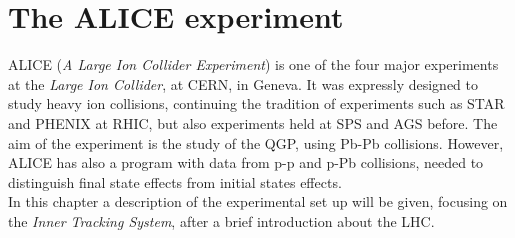\chapter{The ALICE experiment}
ALICE (\textit{A Large Ion Collider Experiment}) is one of the four major experiments at the \textit{Large Ion Collider}, at CERN, in Geneva. It was expressly designed to study heavy ion collisions, continuing the tradition of experiments such as STAR and PHENIX at RHIC, but also experiments held at SPS and AGS before. The aim of the experiment is the study of the QGP, using Pb-Pb collisions. However, ALICE has also a program with data from p-p and p-Pb collisions, needed to distinguish final state effects from initial states effects.\\
In this chapter a description of the experimental set up will be given, focusing on the \textit{Inner Tracking System}, after a brief introduction about the LHC.\\
